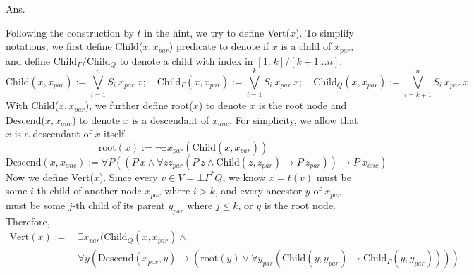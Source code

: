 \documentclass[10pt]{homework}
\begin{document}
\bigskip
Ans.

\newcommand{\Child}{\ensuremath{\text{Child}}}
\newcommand{\ChildG}{\ensuremath{\text{Child}_{\Gamma}}}
\newcommand{\ChildQ}{\ensuremath{\text{Child}_Q}}


Following the construction by \(t\) in the hint, we try to define Vert(\(x\)).
To simplify notations, we first define Child(\(x, x_{par}\)) predicate to denote if \(x\) is
a child of \(x_{par}\), and define \(\text{Child}_{\Gamma}/\text{Child}_{Q}\)
to denote a child with index in \([1..k]/[k+1...n]\).
\[
\Child(x, x_{par}) := \bigvee_{i=1}^n S_i~x_{par}~x ; \quad
\ChildG(x, x_{par}) := \bigvee_{i=1}^k S_i~x_{par}~x ; \quad
\ChildQ(x, x_{par}) := \bigvee_{i=k+1}^n S_i~x_{par}~x
\]
With Child(\(x, x_{par}\)), we further define root(\(x\)) to denote \(x\) is the root node
and Descend(\(x, x_{anc}\)) to denote \(x\) is a descendant of \(x_{anc}\).
For simplicity, we allow that \(x\) is a descendant of \(x\) itself.
\[
\text{root}(x) := \neg \exists x_{par}(\text{Child}(x, x_{par}))
\]
\[
\text{Descend}(x, x_{anc}) := \forall P ((P~x\land \forall z z_{par}(P~z \land \Child(z, z_{par}) \to P~z_{par})) \to P~x_{anc})
\]
Now we define Vert(\(x\)). Since every \( v \in V = \bot \Gamma^* Q\), we know \(x = t(v)\) must be some
\(i\)-th child of another node \(x_{par}\) where \(i > k\),
and every ancestor \(y\) of \(x_{par}\) must be some \(j\)-th child of its parent \(y_{par}\)
where \(j \leq k\), or \(y\) is the root node. Therefore,
\[
\begin{aligned}
	\text{Vert}(x) :=~& \exists x_{par}(\ChildQ(x, x_{par}) \land                                                                                             \\
	                  & \forall y (\text{Descend}(x_{par}, y) \to (\text{root}(y) \lor \forall y_{par}(\Child(y, y_{par}) \to \ChildG(y, y_{par}))))
\end{aligned}
\]
\end{document}
